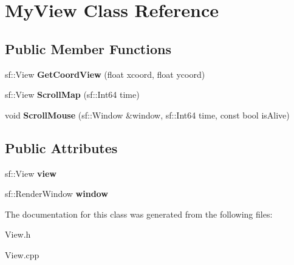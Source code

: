 \hypertarget{class_my_view}{}\section{My\+View Class Reference}
\label{class_my_view}
\subsection*{Public Member Functions}
\begin{DoxyCompactItemize}
\item 
\mbox{\label{class_my_view_adaba5febb33731c437501caa0be18b75}} 
sf\+::\+View {\bfseries Get\+Coord\+View} (float xcoord, float ycoord)
\item 
\mbox{\label{class_my_view_a4d0cef1553c9329a205c1aa8de764a66}} 
sf\+::\+View {\bfseries Scroll\+Map} (sf\+::\+Int64 time)
\item 
\mbox{\label{class_my_view_a8ed8988e427222feae35b3d299ded5fe}} 
void {\bfseries Scroll\+Mouse} (sf\+::\+Window \&window, sf\+::\+Int64 time, const bool is\+Alive)
\end{DoxyCompactItemize}
\subsection*{Public Attributes}
\begin{DoxyCompactItemize}
\item 
\mbox{\label{class_my_view_aa7ba3e20e09a2f693012d2279dbb9a1d}} 
sf\+::\+View {\bfseries view}
\item 
\mbox{\label{class_my_view_ac9e234f611a3db83dfeb342cb821a6dd}} 
sf\+::\+Render\+Window {\bfseries window}
\end{DoxyCompactItemize}


The documentation for this class was generated from the following files\+:\begin{DoxyCompactItemize}
\item 
View.\+h\item 
View.\+cpp\end{DoxyCompactItemize}
